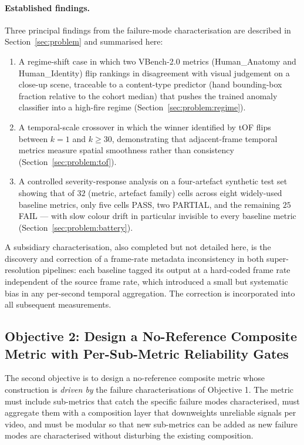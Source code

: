 \paragraph{Established findings.} Three principal findings from the failure-mode
characterisation are described in Section~\ref{sec:problem} and summarised here:

\begin{enumerate}
    \item A regime-shift case in which two VBench-2.0 metrics (Human\_Anatomy and
          Human\_Identity) flip rankings in disagreement with visual judgement on a
          close-up scene, traceable to a content-type predictor (hand bounding-box
          fraction relative to the cohort median) that pushes the trained anomaly
          classifier into a high-fire regime
          (Section~\ref{sec:problem:regime}).
    \item A temporal-scale crossover in which the winner identified by tOF flips between
          $k = 1$ and $k \geq 30$, demonstrating that adjacent-frame temporal metrics
          measure spatial smoothness rather than consistency
          (Section~\ref{sec:problem:tof}).
    \item A controlled severity-response analysis on a four-artefact synthetic test set
          showing that of $32$ (metric, artefact family) cells across eight widely-used
          baseline metrics, only five cells PASS, two PARTIAL, and the remaining $25$
          FAIL --- with slow colour drift in particular invisible to every baseline
          metric (Section~\ref{sec:problem:battery}).
\end{enumerate}

A subsidiary characterisation, also completed but not detailed here, is the discovery and
correction of a frame-rate metadata inconsistency in both super-resolution pipelines: each
baseline tagged its output at a hard-coded frame rate independent of the source frame rate,
which introduced a small but systematic bias in any per-second temporal aggregation. The
correction is incorporated into all subsequent measurements.

\subsection{Objective 2: Design a No-Reference Composite Metric with Per-Sub-Metric
Reliability Gates}
\label{sec:obj:design}

The second objective is to design a no-reference composite metric whose construction is
\emph{driven by} the failure characterisations of Objective 1. The metric must include
sub-metrics that catch the specific failure modes characterised, must aggregate them with a
composition layer that downweights unreliable signals per video, and must be modular so
that new sub-metrics can be added as new failure modes are characterised without
disturbing the existing composition.

